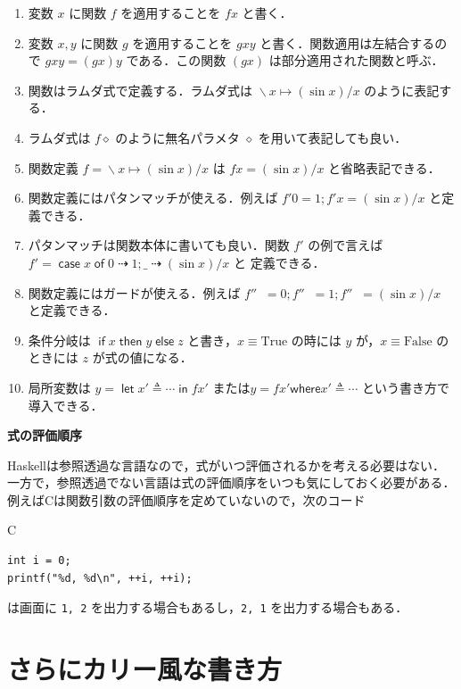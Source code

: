 \documentclass[a5paper,twoside,fleqn,draft]{jsbook}
\newcommand{\programminglanguage}[1]{\textsf{#1}}
\newcommand{\clang}{\programminglanguage{C}}
\newcommand{\haskell}{\programminglanguage{Haskell}}
\newenvironment{note}[1]{\begin{boxnote}\begin{center}\textbf{#1}\end{center}}{\end{boxnote}}
\newcommand{\code}[1]{\texttt{#1}}
\newenvironment{ccode}{\begin{itembox}[r]{\clang}}{\end{itembox}}
\newcommand{\mKeyword}[1]{\mathsf{#1}}
\newcommand{\mIfKeyword}{\mKeyword{if}}
\newcommand{\mCaseKeyword}{\mKeyword{case}}
\newcommand{\mElseKeyword}{\mKeyword{else}}
\newcommand{\mInKeyword}{\mKeyword{in}}
\newcommand{\mLetKeyword}{\mKeyword{let}}
\newcommand{\mOfKeyword}{\mKeyword{of}}
\newcommand{\mOtherwiseKeyword}{\mKeyword{otherwise}}
\newcommand{\mThenKeyword}{\mKeyword{then}}
\newcommand{\mWhereKeyword}{\mKeyword{where}}
\DeclareMathOperator{\mCaseKW}{\mCaseKeyword}
\DeclareMathOperator{\mElse}{\mElseKeyword}
\DeclareMathOperator{\mIf}{\mIfKeyword}
\DeclareMathOperator{\mLet}{\mLetKeyword}
\DeclareMathOperator{\mLetIn}{\mInKeyword}
\DeclareMathOperator{\mOfKW}{\mOfKeyword}
\DeclareMathOperator{\mOtherwise}{\mOtherwiseKeyword}
\DeclareMathOperator{\mThen}{\mThenKeyword}
\newcommand{\mSpecialConstant}[1]{\textrm{#1}}
\newcommand{\mFalse}{\mSpecialConstant{False}}
\newcommand{\mTrue}{\mSpecialConstant{True}}
\newcommand{\mAnonParam}{\diamond}
\DeclareMathOperator{\mIfSo}{\dashrightarrow}
\DeclareMathOperator{\mLambda}{\backslash}
\DeclareMathOperator{\mLambdaArrow}{\mapsto}
\DeclareMathOperator{\mLetEq}{\triangleq}
\newcommand{\mGuard}[1]{\mathop{\mid_{#1}}}
\newcommand{\mCaseOf}[1]{\mCaseKW#1\mOfKW}
\newcommand{\mIfThenElseEXP}[3]{\mIf{#1}\mThen{#2}\mElse{#3}} %
\newcommand{\mLambdaEXP}[2]{\mLambda{#1}\mLambdaArrow{#2}} %
\newcommand{\mLetInEXP}[3]{\mLet#1\mLetEq#2\mLetIn{#3}} %
\newcommand{\mWhereIsEXP}[2]{\mathbin{\mWhereKeyword}#1\mLetEq#2} %
\begin{document}
\begin{enumerate}
\item 変数 $x$ に関数 $f$ を適用することを $fx$ と書く．\item 変数 $x,y$ に関数 $g$ を適用することを $gxy$ と書く．関数適用は左結合するので $gxy=(gx)y$ である．この関数 $(gx)$ は部分適用された関数と呼ぶ．
\item 関数はラムダ式で定義する．ラムダ式は $\mLambdaEXP{x}{(\sin x)/x}$ のように表記する．\item ラムダ式は $f\mAnonParam$ のように無名パラメタ $\mAnonParam$ を用いて表記しても良い．\item 関数定義 $f=\mLambdaEXP{x}{(\sin x)/x}$ は $fx=(\sin x)/x$ と省略表記できる．
\item 関数定義にはパタンマッチが使える．例えば $f'0=1;f'x=(\sin x)/x$ と定義できる．\item パタンマッチは関数本体に書いても良い．関数 $f'$ の例で言えば $f'=\mCaseOf{x}0\mIfSo1;\_\mIfSo(\sin x)/x$ と 定義できる．\item 関数定義にはガードが使える．例えば $f''\mGuard{x<0}=0;f''\mGuard{x\equiv0}=1;f''\mGuard{\mOtherwise}=(\sin x)/x$ と定義できる．\item 条件分岐は $\mIfThenElseEXP{x}{y}{z}$ と書き，$x\equiv\mTrue$ の時には $y$ が，$x\equiv\mFalse$ のときには $z$ が式の値になる．\item 局所変数は $y=\mLetInEXP{x'}{\dotsb}{fx'}$ または$y=fx'\mWhereIsEXP{x'}{\dotsb}$ という書き方で導入できる．
\end{enumerate}


\begin{note}{式の評価順序}
\haskell は参照透過な言語なので，式がいつ評価されるかを考える必要はない．一方で，参照透過でない言語は式の評価順序をいつも気にしておく必要がある．例えば\clang は関数引数の評価順序を定めていないので，次のコード
\begin{ccode}
\begin{verbatim}
int i = 0;
printf("%d, %d\n", ++i, ++i);
\end{verbatim}
\end{ccode}
は画面に \code{1, 2} を出力する場合もあるし，\code{2, 1} を出力する場合もある．
\end{note}

\chapter{さらにカリー風な書き方}
\label{ch:more-curry}
\end{document}
